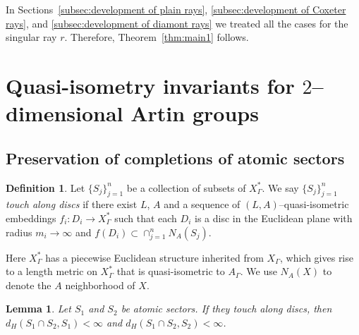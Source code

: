 \documentclass[11pt]{amsart}
\newtheorem{lemma}[theorem]{Lemma}
\theoremstyle{definition}
\newtheorem{definition}[theorem]{Definition}
\newcommand{\Xa}{X^{\ast}}
\begin{document}
In Sections~\ref{subsec:development of plain rays}, \ref{subsec:development of Coxeter rays}, and \ref{subsec:development of diamont rays} we treated all the cases for the singular ray $r$. Therefore, Theorem~\ref{thm:main1} follows.

\section{Quasi-isometry invariants for $2$--dimensional Artin groups}
\label{sec:application}
\subsection{Preservation of completions of atomic sectors}
\begin{definition}
	\label{def:}
Let $\{S_j\}_{j=1}^n$ be a collection of subsets of $\Xa_\Gamma$. We say $\{S_j\}_{j=1}^n$ \emph{touch along discs} if there exist $L$, $A$ and a sequence of $(L,A)$--quasi-isometric embeddings $f_i\colon D_i\to \Xa_\Gamma$ such that each $D_i$ is a disc in the Euclidean plane with radius $m_i\to \infty$ and $f(D_i)\subset \cap_{j=1}^nN_A(S_j)$.
\end{definition}
Here $\Xa_\Gamma$ has a piecewise Euclidean structure inherited from $X_\Gamma$, which gives rise to a length metric on $\Xa_\Gamma$ that is quasi-isometric to $A_\Gamma$. We use $N_A(X)$ to denote the $A$ neighborhood of $X$. 

\begin{lemma}
	\label{lem:sector touch}
	Let $S_1$ and $S_2$ be atomic sectors. If they touch along discs, then $d_H(S_1\cap S_2,S_1)<\infty$ and $d_H(S_1\cap S_2,S_2)<\infty$.
\end{lemma}
\end{document}
